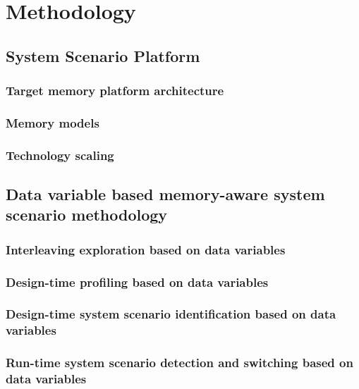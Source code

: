 \chapter{Methodology}
\label{method}

\section{System Scenario Platform}

\subsection{Target memory platform architecture}

\subsection{Memory models}

\subsection{Technology scaling}

\section{Data variable based memory-aware system scenario methodology}

\subsection{Interleaving exploration based on data variables}

\subsection{Design-time profiling based on data variables}

\subsection{Design-time system scenario identification based on data variables}

\subsection{Run-time system scenario detection and switching based on data variables}



